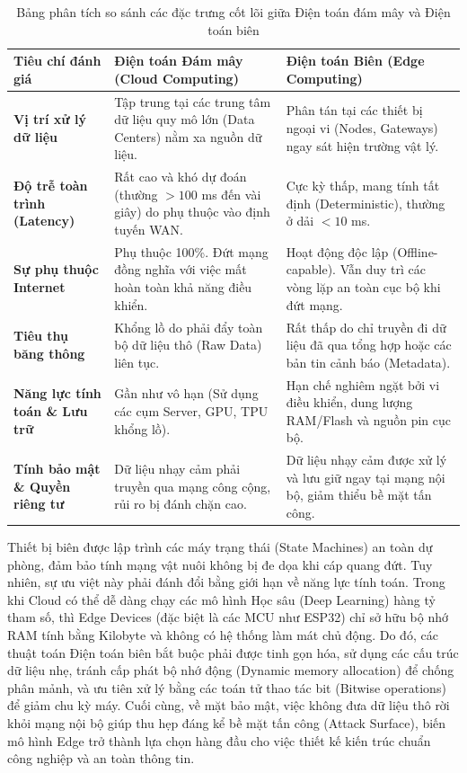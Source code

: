 \begin{table}[H]
\centering
\caption{Bảng phân tích so sánh các đặc trưng cốt lõi giữa Điện toán đám mây và Điện toán biên}
\label{Bảng 2.1}
\renewcommand{\arraystretch}{1.5}
\begin{tabular}{p{3.5cm} p{5.5cm} p{5.5cm}}
\hline
\textbf{Tiêu chí đánh giá} & \textbf{Điện toán Đám mây (Cloud Computing)} & \textbf{Điện toán Biên (Edge Computing)} \\ \hline
\textbf{Vị trí xử lý dữ liệu} & Tập trung tại các trung tâm dữ liệu quy mô lớn (Data Centers) nằm xa nguồn dữ liệu. & Phân tán tại các thiết bị ngoại vi (Nodes, Gateways) ngay sát hiện trường vật lý. \\ 
\textbf{Độ trễ toàn trình (Latency)} & Rất cao và khó dự đoán (thường $> 100$ ms đến vài giây) do phụ thuộc vào định tuyến WAN. & Cực kỳ thấp, mang tính tất định (Deterministic), thường ở dải $< 10$ ms. \\ 
\textbf{Sự phụ thuộc Internet} & Phụ thuộc 100\%. Đứt mạng đồng nghĩa với việc mất hoàn toàn khả năng điều khiển. & Hoạt động độc lập (Offline-capable). Vẫn duy trì các vòng lặp an toàn cục bộ khi đứt mạng. \\ 
\textbf{Tiêu thụ băng thông} & Khổng lồ do phải đẩy toàn bộ dữ liệu thô (Raw Data) liên tục. & Rất thấp do chỉ truyền đi dữ liệu đã qua tổng hợp hoặc các bản tin cảnh báo (Metadata). \\ 
\textbf{Năng lực tính toán \& Lưu trữ} & Gần như vô hạn (Sử dụng các cụm Server, GPU, TPU khổng lồ). & Hạn chế nghiêm ngặt bởi vi điều khiển, dung lượng RAM/Flash và nguồn pin cục bộ. \\ 
\textbf{Tính bảo mật \& Quyền riêng tư} & Dữ liệu nhạy cảm phải truyền qua mạng công cộng, rủi ro bị đánh chặn cao. & Dữ liệu nhạy cảm được xử lý và lưu giữ ngay tại mạng nội bộ, giảm thiểu bề mặt tấn công. \\ \hline
\end{tabular}
\end{table}
Thiết bị biên được lập trình các máy trạng thái (State Machines) an toàn dự phòng, đảm bảo tính mạng vật nuôi không bị đe dọa khi cáp quang đứt. Tuy nhiên, sự ưu việt này phải đánh đổi bằng giới hạn về năng lực tính toán. Trong khi Cloud có thể dễ dàng chạy các mô hình Học sâu (Deep Learning) hàng tỷ tham số, thì Edge Devices (đặc biệt là các MCU như ESP32) chỉ sở hữu bộ nhớ RAM tính bằng Kilobyte và không có hệ thống làm mát chủ động. Do đó, các thuật toán Điện toán biên bắt buộc phải được tinh gọn hóa, sử dụng các cấu trúc dữ liệu nhẹ, tránh cấp phát bộ nhớ động (Dynamic memory allocation) để chống phân mảnh, và ưu tiên xử lý bằng các toán tử thao tác bit (Bitwise operations) để giảm chu kỳ máy. Cuối cùng, về mặt bảo mật, việc không đưa dữ liệu thô rời khỏi mạng nội bộ giúp thu hẹp đáng kể bề mặt tấn công (Attack Surface), biến mô hình Edge trở thành lựa chọn hàng đầu cho việc thiết kế kiến trúc chuẩn công nghiệp và an toàn thông tin.
